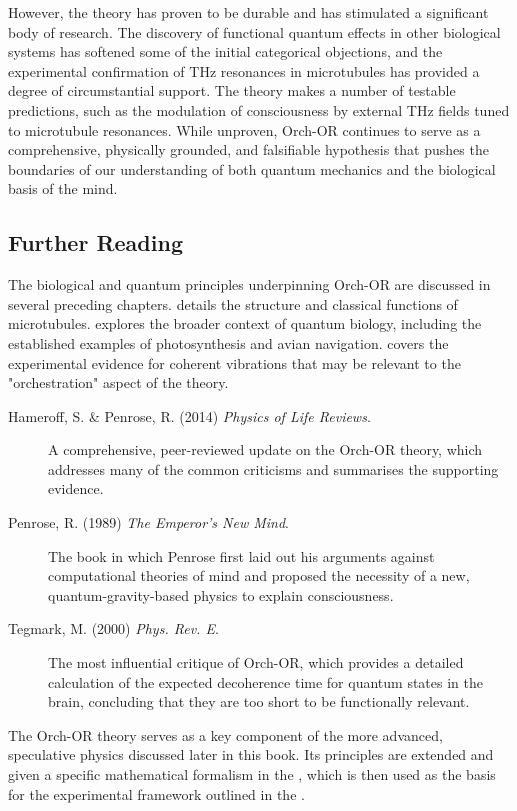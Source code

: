 However, the theory has proven to be durable and has stimulated a significant body of research. The discovery of functional quantum effects in other biological systems has softened some of the initial categorical objections, and the experimental confirmation of THz resonances in microtubules has provided a degree of circumstantial support. The theory makes a number of testable predictions, such as the modulation of consciousness by external THz fields tuned to microtubule resonances. While unproven, Orch-OR continues to serve as a comprehensive, physically grounded, and falsifiable hypothesis that pushes the boundaries of our understanding of both quantum mechanics and the biological basis of the mind.

\begin{importantbox}
\section*{Further Reading}
The biological and quantum principles underpinning Orch-OR are discussed in several preceding chapters.  details the structure and classical functions of microtubules.  explores the broader context of quantum biology, including the established examples of photosynthesis and avian navigation.  covers the experimental evidence for coherent vibrations that may be relevant to the "orchestration" aspect of the theory.

\begin{description}
    \item[Hameroff, S. \& Penrose, R. (2014) \textit{Physics of Life Reviews}.] A comprehensive, peer-reviewed update on the Orch-OR theory, which addresses many of the common criticisms and summarises the supporting evidence.
    \item[Penrose, R. (1989) \textit{The Emperor's New Mind}.] The book in which Penrose first laid out his arguments against computational theories of mind and proposed the necessity of a new, quantum-gravity-based physics to explain consciousness.
    \item[Tegmark, M. (2000) \textit{Phys. Rev. E}.] The most influential critique of Orch-OR, which provides a detailed calculation of the expected decoherence time for quantum states in the brain, concluding that they are too short to be functionally relevant.
\end{description}

The Orch-OR theory serves as a key component of the more advanced, speculative physics discussed later in this book. Its principles are extended and given a specific mathematical formalism in the , which is then used as the basis for the experimental framework outlined in the .
\end{importantbox}
